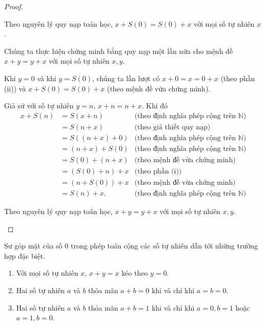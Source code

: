 \begin{proof}
\begin{enumerate}[label={(\roman*)}]
		      Theo nguyên lý quy nạp toán học, $x + S(0) = S(0) + x$ với mọi số tự nhiên $x$.

		      Chúng ta thực hiện chứng minh bằng quy nạp một lần nữa cho mệnh đề $x + y = y + x$ với mọi số tự nhiên $x, y$.

		      Khi $y = 0$ và khi $y = S(0)$, chúng ta lần lượt có $x + 0 = x = 0 + x$ (theo phần (ii)) và $x + S(0) = S(0) + x$ (theo mệnh đề vừa chứng minh).

		      Giả sử với số tự nhiên $y = n$, $x + n = n + x$. Khi đó
		      \begin{align*}
			      x + S(n) & = S(x + n)       & \text{(theo định nghĩa phép cộng trên $\mathbb{N}$)} \\
			               & = S(n + x)       & \text{(theo giả thiết quy nạp)}                      \\
			               & = S((n + x) + 0) & \text{(theo định nghĩa phép cộng trên $\mathbb{N}$)} \\
			               & = (n + x) + S(0) & \text{(theo định nghĩa phép cộng trên $\mathbb{N}$)} \\
			               & = S(0) + (n + x) & \text{(theo mệnh đề vừa chứng minh)}                 \\
			               & = (S(0) + n) + x & \text{(theo phần (i))}                               \\
			               & = (n + S(0)) + x & \text{(theo mệnh đề vừa chứng minh)}                 \\
			               & = S(n) + x.      & \text{(theo định nghĩa phép cộng trên $\mathbb{N}$)}
		      \end{align*}

		      Theo nguyên lý quy nạp toán học, $x + y = y + x$ với mọi số tự nhiên $x, y$.
	\end{enumerate}
\end{proof}

Sư góp mặt của số $0$ trong phép toán cộng các số tự nhiên dẫn tới những trường hợp  đặc biệt.
\begin{theorem}\label{theorem:addition-and-zero}
	\begin{enumerate}[label={(\roman*)}]
		\item Với mọi số tự nhiên $x$, $x + y = x$ kéo theo $y = 0$.
		\item Hai số tự nhiên $a$ và $b$ thỏa mãn $a + b = 0$ khi và chỉ khi $a = b = 0$.
		\item Hai số tự nhiên $a$ và $b$ thỏa mãn $a + b = 1$ khi và chỉ khi $a = 0, b = 1$ hoặc $a = 1, b = 0$.
	\end{enumerate}
\end{theorem}

